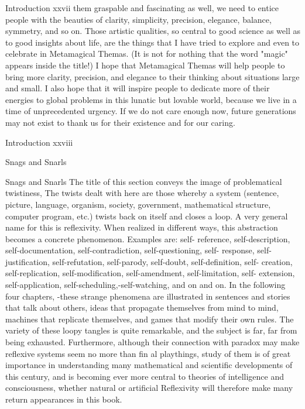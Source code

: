 Introduction                                                                         xxvii them graspable and fascinating as well, we need to entice people with the beauties of clarity, simplicity, precision, elegance, balance, symmetry, and so on. Those artistic qualities, so central to good science as well as to good insights about life, are the things that I have tried to explore and even to celebrate in Metamagical Themas. (It is not for nothing that the word "magic" appears inside the title!) I hope that Metamagical Themas will help people to bring more clarity, precision, and elegance to their thinking about situations large and small. I also hope that it will inspire people to dedicate more of their energies to global problems in this lunatic but lovable world, because we live in a time of unprecedented urgency. If we do not care enough now, future generations may not exist to thank us for their existence and for our caring. 



Introduction                                                                      xxviii 

Snags and Snarls 




Snags and Snarls The title of this section conveys the image of problematical twistiness, The twists dealt with here are those whereby a system (sentence, picture, language, organism, society, government, mathematical structure, computer program, etc.) twists back on itself and closes a loop. A very general name for this is reflexivity. When realized in different ways, this abstraction becomes a concrete phenomenon. Examples are: self- reference, self-description, self-documentation, self-contradiction, self-questioning, self- response, self-justification, self-refutation, self-parody, self-doubt, self-definition, self- creation, self-replication, self-modification, self-amendment, self-limitation, self- extension, self-application, self-scheduling,-self-watching, and on and on. In the following four chapters, -these strange phenomena are illustrated in sentences and stories that talk about others, ideas that propagate themselves from mind to mind, machines that replicate themselves, and games that modify their own rules. The variety of these loopy tangles is quite remarkable, and the subject is far, far from being exhausted. Furthermore, although their connection with paradox may make reflexive systems seem no more than fin al playthings, study of them is of great importance in understanding many mathematical and scientific developments of this century, and is becoming ever more central to theories of intelligence and consciousness, whether natural or artificial Reflexivity will therefore make many return appearances in this book. 



